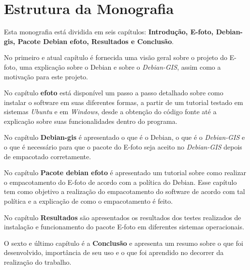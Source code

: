 \section*{Estrutura da Monografia}

Esta monografia está dividida em seis capítulos: \textbf{Introdução, E-foto, Debian-gis, Pacote Debian efoto, Resultados e Conclusão}.

No primeiro e atual capítulo é fornecida uma visão geral sobre o projeto do E-foto, uma explicação sobre o Debian e sobre o \textit{Debian-GIS}, assim como a motivação para este projeto.

No capítulo \textbf{efoto} está disponível um passo a passo detalhado sobre como instalar o software em suas diferentes formas, a partir de um tutorial testado em sistemas \textit{Ubuntu} e em \textit{Windows}, desde a obtenção do código fonte até a explicação sobre suas funcionalidades dentro do programa.

No capítulo \textbf{Debian-gis} é apresentado o que é o Debian, o que é o \textit{Debian-GIS} e o que é necessário para que o pacote do E-foto seja aceito no \textit{Debian-GIS} depois de empacotado corretamente.

No capítulo \textbf{Pacote debian efoto} é apresentado um tutorial sobre como realizar o empacotamento do E-foto de acordo com a política do Debian. Esse capítulo tem como objetivo a realização do empacotamento do software de acordo com tal política e a explicação de como o empacotamento é feito.

No capítulo \textbf{Resultados} são apresentados os resultados dos testes realizados de instalação e funcionamento do pacote E-foto em diferentes sistemas operacionais.

O sexto e último capítulo é a \textbf{Conclusão} e apresenta um resumo sobre o que foi desenvolvido, importância de seu uso e o que foi aprendido no decorrer da realização do trabalho.
